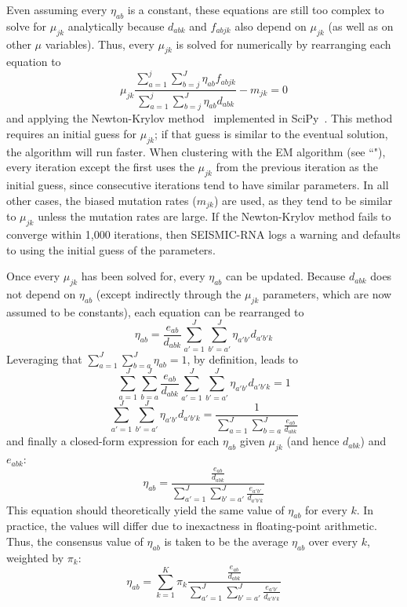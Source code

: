 \documentclass{article}
\begin{document}
Even assuming every $\eta_{ab}$ is a constant, these equations are still too complex to solve for $\mu_{jk}$ analytically because $d_{abk}$ and $f_{abjk}$ also depend on $\mu_{jk}$ (as well as on other $\mu$ variables).
Thus, every $\mu_{jk}$ is solved for numerically by rearranging each equation to
\begin{equation}
    \mu_{jk} \frac{\sum_{a=1}^{j}\sum_{b=j}^{J}\eta_{ab} f_{abjk}}{\sum_{a=1}^{j}\sum_{b=j}^{J}\eta_{ab}d_{abk}} - m_{jk} = 0
\end{equation}
and applying the Newton-Krylov method~\cite{Knoll2004} implemented in SciPy~\cite{Virtanen2020}.
This method requires an initial guess for $\mu_{jk}$; if that guess is similar to the eventual solution, the algorithm will run faster.
When clustering with the EM algorithm (see ``"), every iteration except the first uses the $\mu_{jk}$ from the previous iteration as the initial guess, since consecutive iterations tend to have similar parameters.
In all other cases, the biased mutation rates ($m_{jk}$) are used, as they tend to be similar to $\mu_{jk}$ unless the mutation rates are large.
If the Newton-Krylov method fails to converge within 1,000 iterations, then SEISMIC-RNA logs a warning and defaults to using the initial guess of the parameters.

Once every $\mu_{jk}$ has been solved for, every $\eta_{ab}$ can be updated.
Because $d_{abk}$ does not depend on $\eta_{ab}$ (except indirectly through the $\mu_{jk}$ parameters, which are now assumed to be constants), each equation can be rearranged to
\begin{equation}
    \eta_{ab} = \frac{e_{ab}}{d_{abk}} \sum_{a'=1}^{J} \sum_{b'=a'}^{J} \eta_{a'b'} d_{a'b'k}
\end{equation}
Leveraging that $\sum_{a=1}^{J} \sum_{b=a}^{J} \eta_{ab} = 1$, by definition, leads to
\begin{equation}
    \sum_{a=1}^{J} \sum_{b=a}^{J} \frac{e_{ab}}{d_{abk}} \sum_{a'=1}^{J} \sum_{b'=a'}^{J} \eta_{a'b'} d_{a'b'k} = 1
\end{equation}
\begin{equation}
    \sum_{a'=1}^{J} \sum_{b'=a'}^{J} \eta_{a'b'} d_{a'b'k} = \frac{1}{\sum_{a=1}^{J} \sum_{b=a}^{J} \frac{e_{ab}}{d_{abk}}}
\end{equation}
and finally a closed-form expression for each $\eta_{ab}$ given $\mu_{jk}$ (and hence $d_{abk}$) and $e_{abk}$:
\begin{equation}
    \eta_{ab} = \frac{\frac{e_{ab}}{d_{abk}}}{\sum_{a'=1}^{J} \sum_{b'=a'}^{J} \frac{e_{a'b'}}{d_{a'b'k}}}
\end{equation}
This equation should theoretically yield the same value of $\eta_{ab}$ for every $k$.
In practice, the values will differ due to inexactness in floating-point arithmetic.
Thus, the consensus value of $\eta_{ab}$ is taken to be the average $\eta_{ab}$ over every $k$, weighted by $\pi_k$:
\begin{equation}
    \eta_{ab} = \sum_{k=1}^{K} \pi_k \frac{\frac{e_{ab}}{d_{abk}}}{\sum_{a'=1}^{J} \sum_{b'=a'}^{J} \frac{e_{a'b'}}{d_{a'b'k}}}
\end{equation}
\end{document}
